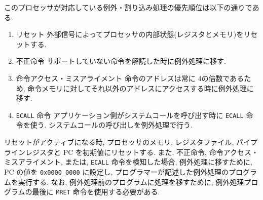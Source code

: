 \documentclass[../specifications.tex]{subfiles}
\begin{document}
  このプロセッサが対応している例外・割り込み処理の優先順位は以下の通りである.
  \begin{enumerate}
    \item リセット
    \newline 外部信号によってプロセッサの内部状態(レジスタとメモリ)をリセットする.

    \item 不正命令
    \newline サポートしていない命令を解読した時に例外処理に移す.

    \item 命令アクセス・ミスアライメント
    \newline 命令のアドレスは常に 4の倍数であるため, 
    命令メモリに対してそれ以外のアドレスにアクセスする時に例外処理に移す.

    \item \verb|ECALL| 命令
    \newline アプリケーション側がシステムコールを呼び出す時に \verb|ECALL| 命令を使う.
    システムコールの呼び出しを例外処理で行う.
  \end{enumerate}

  リセットがアクティブになる時, 
  プロセッサのメモリ, レジスタファイル, パイプラインレジスタと PC を初期値にリセットする.
  また, 不正命令, 命令アクセス・ミスアライメント, または, \verb|ECALL| 命令を検知した場合, 
  例外処理に移すために, PC の値を \verb|0x0000_0000| に設定し, 
  プログラマーが記述した例外処理のプログラムを実行する.
  なお, 例外処理前のプログラムに処理を移すために, 
  例外処理プログラムの最後に \verb|MRET| 命令を使用する必要がある.
\end{document}
